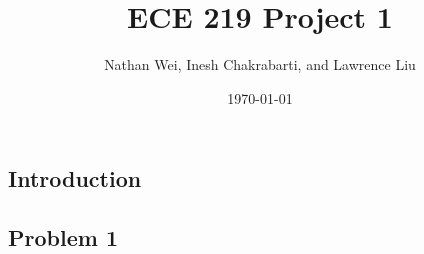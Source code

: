 \documentclass[11pt]{article}
\title{ECE 219 Project 1} %
\author{Nathan Wei, Inesh Chakrabarti, and Lawrence Liu} %
\date{\today}
\begin{document}
\maketitle
\begin{multicols}{2}
\section*{Introduction}
\subsection*{Problem 1}
\end{multicols}
\end{document}
